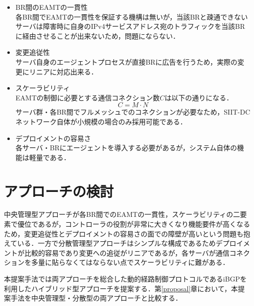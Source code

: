 \begin{itemize}
    \item BR間のEAMTの一貫性 \\
    各BR間でEAMTの一貫性を保証する機構は無いが，当該BRと疎通できないサーバは障害時に自身のIPv4サービスアドレス宛のトラフィックを当該BRに経由させることが出来ないため，問題にならない．
    \item 変更追従性 \\
    サーバ自身のエージェントプロセスが直接BRに広告を行うため，実際の変更にリニアに対応出来る．
    \item スケーラビリティ　\\
    EAMTの制御に必要とする通信コネクション数$C$は以下の通りになる．
    \begin{equation}
        C =  M \cdot N 
    \end{equation}
    サーバ群・各BR間でフルメッシュでのコネクションが必要なため，SIIT-DCネットワーク自体が小規模の場合のみ採用可能である．

    \item デプロイメントの容易さ　\\
    各サーバ・BRにエージェントを導入する必要があるが，システム自体の機能は軽量である．
\end{itemize}

\section{アプローチの検討}

中央管理型アプローチが各BR間でのEAMTの一貫性，スケーラビリティの二要素で優位であるが，コントローラの役割が非常に大きくなり機能要件が高くなるため，変更追従性とデプロイメントの容易さの面での障壁が高いという問題も抱えている．一方で分散管理型アプローチはシンプルな構成であるためデプロイメントが比較的容易であり変更への追従がリニアであるが，各サーバが通信コネクションを多量に貼らなくてはならない点でスケーラビリティに難がある．

本提案手法では両アプローチを総合した動的経路制御プロトコルであるiBGPを利用したハイブリッド型アプローチを提案する．第\ref{proposal}章において，本提案手法を中央管理型・分散型の両アプローチと比較する．


